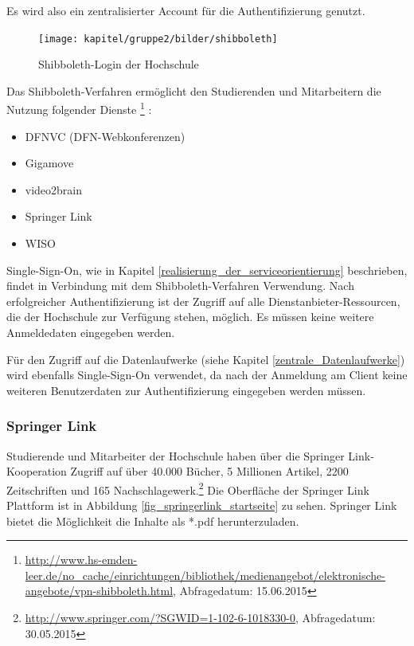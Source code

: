 Es wird also ein zentralisierter Account für die Authentifizierung genutzt.  

\begin{figure}
	\centering
	\texttt{[image: kapitel/gruppe2/bilder/shibboleth]}
	\caption{Shibboleth-Login der Hochschule \protect\footnotemark}
	\label{fig_shibboleth_hs}
\end{figure}

Das Shibboleth-Verfahren ermöglicht den Studierenden und Mitarbeitern die Nutzung folgender Dienste \footnote{\url{http://www.hs-emden-leer.de/no_cache/einrichtungen/bibliothek/medienangebot/elektronische-angebote/vpn-shibboleth.html}, Abfragedatum: 15.06.2015} :

\begin{itemize}
	\item DFNVC (DFN-Webkonferenzen)
	\item Gigamove
	\item video2brain
	\item Springer Link	
	\item WISO	
\end{itemize}

Single-Sign-On, wie in Kapitel \ref{realisierung_der_serviceorientierung} beschrieben, findet in Verbindung mit dem Shibboleth-Verfahren Verwendung. Nach erfolgreicher Authentifizierung ist der Zugriff auf alle Dienstanbieter-Ressourcen, die der Hochschule zur Verfügung stehen, möglich. Es müssen keine weitere Anmeldedaten eingegeben werden.

Für den Zugriff auf die Datenlaufwerke (siehe Kapitel \ref{zentrale_Datenlaufwerke}) wird ebenfalls Single-Sign-On verwendet, da nach der Anmeldung am Client keine weiteren Benutzerdaten zur Authentifizierung eingegeben werden müssen. 

\subsubsection{Springer Link}
Studierende und Mitarbeiter der Hochschule haben über die Springer Link-Kooperation Zugriff auf über 40.000 Bücher, 5 Millionen Artikel, 2200 Zeitschriften und 165 Nachschlagewerk.\footnote{\url {http://www.springer.com/?SGWID=1-102-6-1018330-0}, Abfragedatum: 30.05.2015} Die Oberfläche der Springer Link Plattform ist in Abbildung \ref{fig_springerlink_startseite} zu sehen. Springer Link bietet die Möglichkeit die Inhalte als *.pdf herunterzuladen. 

